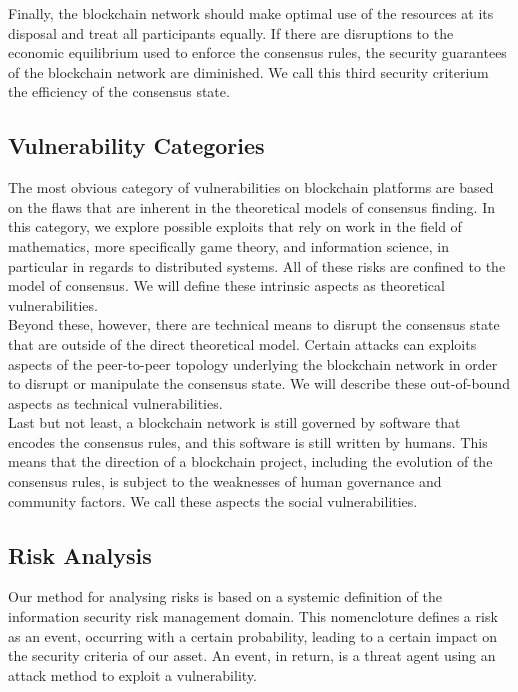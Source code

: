 \documentclass[11pt,a4paper,draft]{article}
\begin{document}
Finally, the blockchain network should make optimal use of the resources at its disposal and treat all participants equally. If there are disruptions to the economic equilibrium used to enforce the consensus rules, the security guarantees of the blockchain network are diminished. We call this third security criterium the efficiency of the consensus state.\\

\subsection{Vulnerability Categories}

The most obvious category of vulnerabilities on blockchain platforms are based on the flaws that are inherent in the theoretical models of consensus finding. In this category, we explore possible exploits that rely on work in the field of mathematics, more specifically game theory, and information science, in particular in regards to distributed systems. All of these risks are confined to the model of consensus. We will define these intrinsic aspects as theoretical vulnerabilities.\\

Beyond these, however, there are technical means to disrupt the consensus state that are outside of the direct theoretical model. Certain attacks can exploits aspects of the peer-to-peer topology underlying the blockchain network in order to disrupt or manipulate the consensus state. We will describe these out-of-bound aspects as technical vulnerabilities.\\

Last but not least, a blockchain network is still governed by software that encodes the consensus rules, and this software is still written by humans. This means that the direction of a blockchain project, including the evolution of the consensus rules, is subject to the weaknesses of human governance and community factors. We call these aspects the social vulnerabilities.\\

\subsection{Risk Analysis}

Our method for analysing risks is based on a systemic definition of the information security risk management domain. This nomencloture defines a risk as an event, occurring with a certain probability, leading to a certain impact on the security criteria of our asset. An event, in return, is a threat agent using an attack method to exploit a vulnerability.\\
\end{document}
